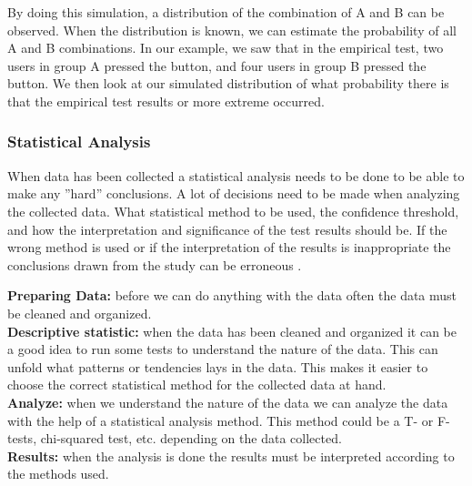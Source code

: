 By doing this simulation, a distribution of the combination of A and B can be observed. When the distribution is known, we can estimate the probability of all A and B combinations. In our example, we saw that in the empirical test, two users in group A pressed the button, and four users in group B pressed the button.  We then look at our simulated distribution of what probability there is that the empirical test results or more extreme occurred.  


\subsubsection{Statistical Analysis}%
\label{sub:Statistical analysis}
When data has been collected a statistical analysis needs to be done to be able to make any ''hard'' conclusions. A lot of decisions need to be made when analyzing the collected data. What statistical method to be used, the confidence threshold, and how the interpretation and significance of the test results should be. If the wrong method is used or if the interpretation of the results is inappropriate the conclusions drawn from the study can be erroneous \cite{lazar2017research}. 


\textbf{Preparing Data:} before we can do anything with the data often the data must be cleaned and organized.\\
\textbf{Descriptive statistic:} when the data has been cleaned and organized it can be a good idea to run some tests to understand the nature of the data. This can unfold what patterns or tendencies lays in the data. This makes it easier to choose the correct statistical method for the collected data at hand.\\
\textbf{Analyze:} when we understand the nature of the data we can analyze the data with the help of a statistical analysis method. This method could be a T- or F-tests, chi-squared test, etc. depending on the data collected.\\ 
\textbf{Results:} when the analysis is done the results must be interpreted according to the methods used.\\



